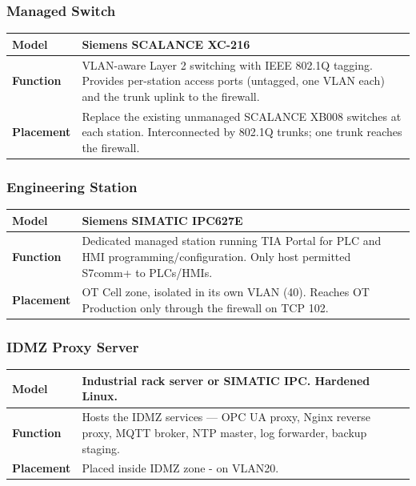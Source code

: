 \documentclass[11pt,a4paper]{article}
\renewcommand{\arraystretch}{1.15}
\begin{document}
\subsubsection{Managed Switch}
\renewcommand{\arraystretch}{1.3} %
\begin{tabularx}{\textwidth}{>{\bfseries}p{2.5cm} X}
    \toprule
    Model & Siemens SCALANCE XC-216  \\
    \midrule
    Function & VLAN-aware Layer 2 switching with IEEE 802.1Q tagging. Provides
    per-station access ports (untagged, one VLAN each) and the trunk uplink to
    the firewall. \\
    \midrule
    Placement & Replace the existing unmanaged SCALANCE XB008 switches at each
    station. Interconnected by 802.1Q trunks; one trunk reaches the firewall.
    \\
    \midrule
\end{tabularx}

\subsubsection{Engineering Station}
\renewcommand{\arraystretch}{1.3} %
\begin{tabularx}{\textwidth}{>{\bfseries}p{2.5cm} X}
    \toprule
    Model & Siemens SIMATIC IPC627E\\
    \midrule
    Function & Dedicated managed station running TIA Portal for PLC and HMI
    programming/configuration. Only host permitted S7comm+ to PLCs/HMIs.\\
    \midrule
    Placement & OT Cell zone, isolated in its own VLAN (40). Reaches OT
    Production only through the firewall on TCP 102.\\
    \midrule
\end{tabularx}

\subsubsection{IDMZ Proxy Server}
\renewcommand{\arraystretch}{1.3} %
\begin{tabularx}{\textwidth}{>{\bfseries}p{2.5cm} X}
    \toprule
    Model & Industrial rack server or SIMATIC IPC. Hardened Linux.\\
    \midrule
    Function & Hosts the IDMZ services — OPC UA proxy, Nginx reverse proxy,
    MQTT broker, NTP master, log forwarder, backup staging. \\
    \midrule
    Placement & Placed inside IDMZ zone - on VLAN20. \\
    \midrule
\end{tabularx}
\end{document}

